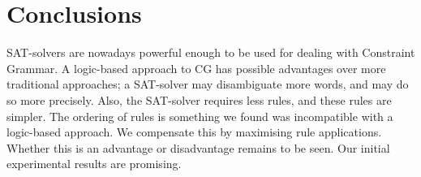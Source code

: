 \documentclass[11pt]{article}
\begin{document}
\section{Conclusions}

SAT-solvers are nowadays powerful enough to be used for dealing with Constraint Grammar. A logic-based approach to CG has possible advantages over more traditional approaches; a SAT-solver may disambiguate more words, and may do so more precisely. Also, the SAT-solver requires less rules, and these rules are simpler. The ordering of rules is something we found was incompatible with a logic-based approach. We compensate this by maximising rule applications. Whether this is an advantage or disadvantage remains to be seen. Our initial experimental results are promising.






\end{document}
